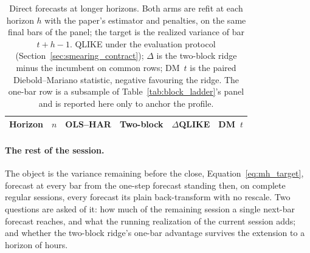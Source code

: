 \begin{table}[H]
\centering
\caption{Direct forecasts at longer horizons. Both arms are refit at
each horizon $h$ with the paper's estimator and penalties, on the same
final \mhpNBars{} bars of the panel; the target is the realized
variance of bar $t+h-1$. QLIKE under the evaluation protocol
(Section~\ref{sec:smearing_contract}); $\Delta$ is the two-block ridge
minus the incumbent on common rows; DM~$t$ is the paired
Diebold--Mariano statistic, negative favouring the ridge. The one-bar
row is a subsample of Table~\ref{tab:block_ladder}'s panel and is
reported here only to anchor the profile.
\label{tab:multih_profile}}
\begin{tabular}{@{}lcccrr@{}}
\toprule
Horizon & $n$ & OLS--HAR & Two-block & $\Delta$QLIKE & DM~$t$ \\
\midrule

\end{tabular}
\end{table}

\fi

\paragraph{The rest of the session.} The object is the variance
remaining before the close, Equation~\eqref{eq:mh_target}, forecast at
every bar from the one-step forecast standing then, on \mhNDays{}
complete regular sessions, every forecast its plain back-transform with
no rescale. Two questions are asked of it: how much of
the remaining session a single next-bar forecast reaches, and what the
running realization of the current session adds; and whether the
two-block ridge's one-bar advantage survives the extension to a horizon
of hours.

